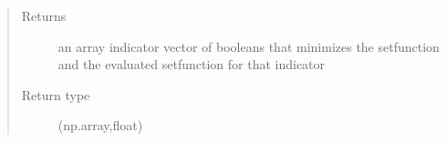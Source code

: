 \documentclass[letterpaper,10pt,english]{sphinxmanual}
\begin{document}
\begin{fulllineitems}
\begin{fulllineitems}
\begin{quote}
\begin{description}
\item[{Returns}] \leavevmode
\sphinxAtStartPar
an array indicator vector of booleans that minimizes the setfunction and the evaluated setfunction for that indicator

\item[{Return type}] \leavevmode
\sphinxAtStartPar
(np.array,float)

\end{description}\end{quote}

\end{fulllineitems}


\end{fulllineitems}

\end{document}
